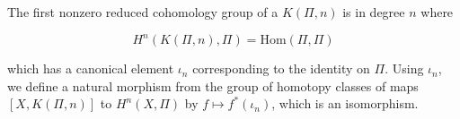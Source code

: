 The first nonzero reduced cohomology group of a $K(\Pi, n)$ is in degree $n$ where

$$H^n(K(\Pi, n), \Pi) = \text{Hom}(\Pi, \Pi)$$

which has a canonical element $\iota_n$ corresponding to the identity on $\Pi$. Using $\iota_n$, we define a natural morphism from the group of homotopy classes of maps $[X, K(\Pi, n)]$ to $H^n(X, \Pi)$ by $f \mapsto f^*(\iota_n)$, which is an isomorphism.
